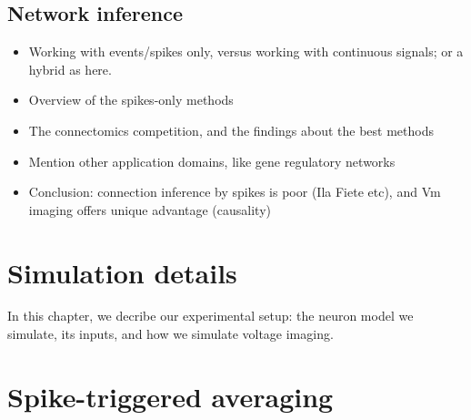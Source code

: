 \documentclass[a4paper, oneside, 11pt]{memoir}
\begin{document}
\section{Network inference}

\begin{itemize}
    \item Working with events/spikes only, versus working with continuous signals; or a hybrid as here.
    \item Overview of the spikes-only methods
    \item The connectomics competition, and the findings about the best methods
    \item Mention other application domains, like gene regulatory networks
    \item Conclusion: connection inference by spikes is poor (Ila Fiete etc), and Vm imaging offers unique advantage (causality)
\end{itemize}




\chapter{Simulation details}

In this chapter, we decribe our experimental setup: the neuron model we simulate, its inputs, and how we simulate voltage imaging.





\chapter{Spike-triggered averaging}
\end{document}
